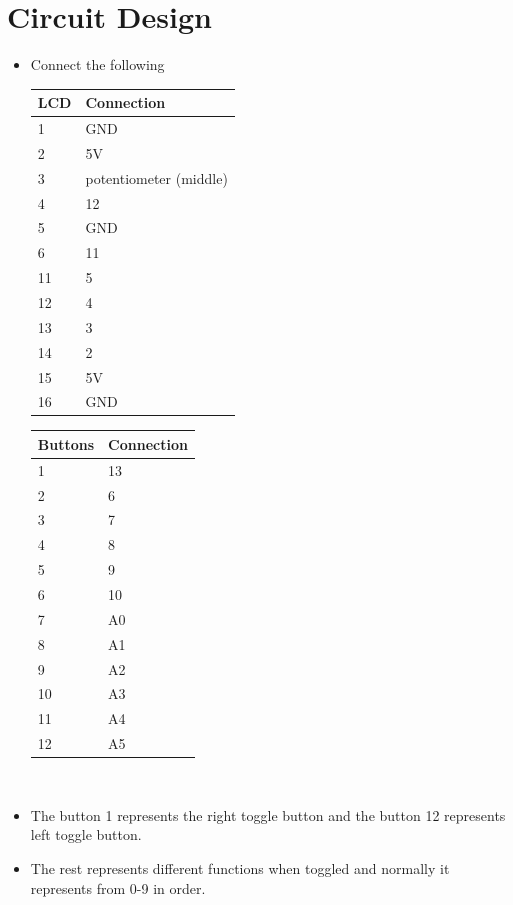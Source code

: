 \documentclass[journal]{IEEEtran}
\begin{document}
\section*{\textbf{Circuit Design}}
\begin{itemize}
    \item Connect the following 
\begin{table}[h]
\centering
\begin{tabular}{|l|l|}
\hline
\textbf{LCD} & \textbf{Connection} \\ \hline
1 & GND \\ \hline
2 & 5V \\ \hline
3 & potentiometer (middle) \\ \hline
4 & 12 \\ \hline
5 & GND \\ \hline
6 & 11 \\ \hline
11 & 5 \\ \hline
12 & 4 \\ \hline
13 & 3 \\ \hline
14 & 2 \\ \hline
15 & 5V \\ \hline
16 & GND \\ \hline
\end{tabular}
\quad
\begin{tabular}{|l|l|}
\hline
\textbf{Buttons} & \textbf{Connection} \\ \hline
1 & 13 \\ \hline
2 & 6 \\ \hline
3 & 7 \\ \hline
4 & 8 \\ \hline
5 & 9 \\ \hline
6 & 10 \\ \hline
7 & A0 \\ \hline
8 & A1 \\ \hline
9 & A2 \\ \hline
10 & A3 \\ \hline
11 & A4 \\ \hline
12 & A5 \\ \hline
\end{tabular}
\end{table}\\
\item The button 1 represents the right toggle button and the button 12 represents left toggle button.
\item The rest represents different functions when toggled and normally it represents from 0-9 in order.
\end{itemize}
\end{document}
